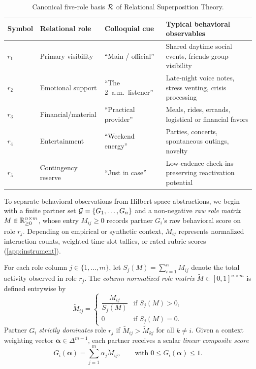 \begin{table}[htbp]
\centering
\small
\caption{Canonical five-role basis $\mathcal{R}$ of Relational Superposition Theory.}
\label{tab:roles}
\begin{tabularx}{\textwidth}{@{}lllX@{}}
\toprule
Symbol & Relational role & Colloquial cue & Typical behavioral observables \\
\midrule
$r_1$ & Primary visibility & ``Main / official'' & Shared daytime social events, friends-group visibility \\
$r_2$ & Emotional support & ``The 2~a.m.\ listener'' & Late-night voice notes, stress venting, crisis processing \\
$r_3$ & Financial/material & ``Practical provider'' & Meals, rides, errands, logistical or financial favors \\
$r_4$ & Entertainment & ``Weekend energy'' & Parties, concerts, spontaneous outings, novelty \\
$r_5$ & Contingency reserve & ``Just in case'' & Low-cadence check-ins preserving reactivation potential \\
\bottomrule
\end{tabularx}
\end{table}

\noindent\layerformal{} To separate behavioral observations from Hilbert-space
abstractions, we begin with a finite partner set $\mathcal{G} = \{G_1, \dots, G_n\}$
and a non-negative \emph{raw role matrix} $M \in \mathbb{R}_{\ge 0}^{n \times m}$, whose entry
$M_{ij} \ge 0$ records partner $G_i$'s raw behavioral score on role $r_j$. Depending
on empirical or synthetic context, $M_{ij}$ represents normalized interaction counts,
weighted time-slot tallies, or rated rubric scores (\cref{app:instrument}).

\begin{definition}
\label{def:role-matrix}
For each role column $j \in \{1, \dots, m\}$, let $S_j(M) = \sum_{i=1}^n M_{ij}$ denote
the total activity observed in role $r_j$. The \emph{column-normalized role matrix}
$\tilde{M} \in [0, 1]^{n \times m}$ is defined entrywise by
\begin{equation}
  \tilde{M}_{ij} =
  \begin{cases}
    \dfrac{M_{ij}}{S_j(M)} & \text{if } S_j(M) > 0, \\[8pt]
    0 & \text{if } S_j(M) = 0.
  \end{cases}
  \label{eq:col-normalize}
\end{equation}
Partner $G_i$ \emph{strictly dominates} role $r_j$ if $\tilde{M}_{ij} > \tilde{M}_{kj}$
for all $k \neq i$. Given a context weighting vector $\boldsymbol{\alpha} \in \Delta^{m-1}$,
each partner receives a scalar \emph{linear composite score}
\begin{equation}
  G_i(\boldsymbol{\alpha}) = \sum_{j=1}^{m} \alpha_j \tilde{M}_{ij},
  \qquad \text{with } 0 \le G_i(\boldsymbol{\alpha}) \le 1.
  \label{eq:global-score}
\end{equation}
\end{definition}

